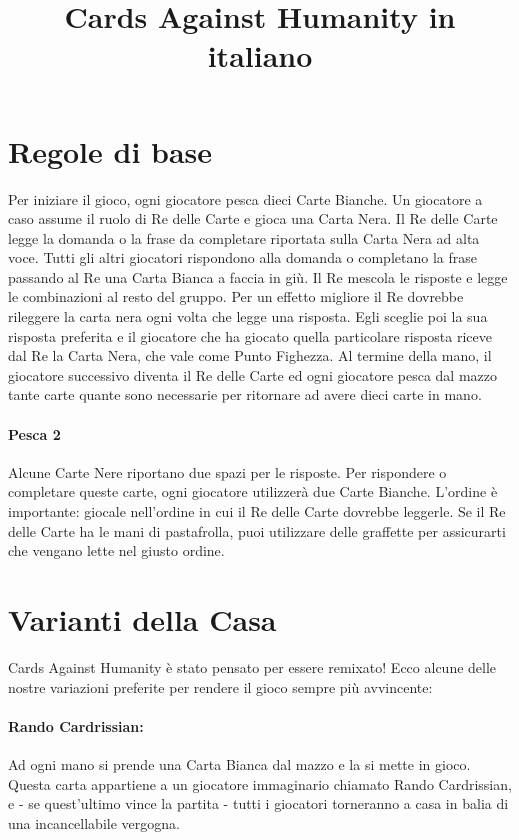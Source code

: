 \documentclass[a4paper,12pt]{article}
\title{Cards Against Humanity in italiano}
\date{}
\author{}
\begin{document}
\maketitle

\section*{Regole di base}
Per iniziare il gioco, ogni giocatore pesca dieci Carte Bianche.
Un giocatore a caso assume il ruolo di Re delle Carte e gioca una Carta Nera. Il Re delle Carte
legge la domanda o la frase da completare riportata sulla Carta Nera ad alta voce.
Tutti gli altri giocatori rispondono alla domanda o completano la frase passando al Re una Carta
Bianca a faccia in giù.
Il Re mescola le risposte e legge le combinazioni al resto del gruppo. Per un effetto migliore il Re
dovrebbe rileggere la carta nera ogni volta che legge una risposta. Egli sceglie poi la sua risposta
preferita e il giocatore che ha giocato quella particolare risposta riceve dal Re la Carta Nera, che
vale come Punto Fighezza.
Al termine della mano, il giocatore successivo diventa il Re delle Carte ed ogni giocatore pesca dal
mazzo tante carte quante sono necessarie per ritornare ad avere dieci carte in mano.

\paragraph{Pesca 2}
Alcune Carte Nere riportano due spazi per le risposte.
Per rispondere o completare queste carte, ogni giocatore utilizzerà due Carte Bianche. L'ordine
è importante: giocale nell'ordine in cui il Re delle Carte dovrebbe leggerle.
Se il Re delle Carte ha le mani di pastafrolla, puoi utilizzare delle graffette per assicurarti che vengano lette nel giusto ordine.

\section*{Varianti della Casa}
Cards Against Humanity è stato pensato per essere remixato! Ecco alcune delle nostre variazioni
preferite per rendere il gioco sempre più avvincente:
\paragraph{Rando Cardrissian:} Ad ogni mano si prende una Carta Bianca dal mazzo e la si mette in
gioco. Questa carta appartiene a un giocatore immaginario chiamato Rando Cardrissian, e - se
quest'ultimo vince la partita - tutti i giocatori torneranno a casa in balia di una incancellabile vergogna.
\end{document}
